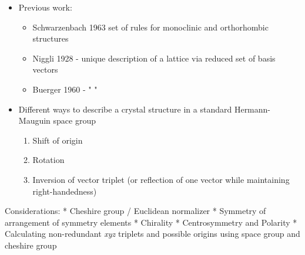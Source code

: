 \documentclass[11pt]{article}
\providecommand{\tightlist}{%
      \setlength{\itemsep}{0pt}\setlength{\parskip}{0pt}}
\begin{document}
\begin{itemize}
\tightlist
\item
  Previous work:

  \begin{itemize}
  \tightlist
  \item
    Schwarzenbach 1963 set of rules for monoclinic and orthorhombic
    structures
  \item
    Niggli 1928 - unique description of a lattice via reduced set of
    basis vectors
  \item
    Buerger 1960 - " "
  \end{itemize}
\item
  Different ways to describe a crystal structure in a standard
  Hermann-Mauguin space group

  \begin{enumerate}
  \def\labelenumi{\arabic{enumi}.}
  \tightlist
  \item
    Shift of origin
  \item
    Rotation
  \item
    Inversion of vector triplet (or reflection of one vector while
    maintaining right-handedness)
  \end{enumerate}
\end{itemize}

Considerations: * Cheshire group / Euclidean normalizer * Symmetry of
arrangement of symmetry elements * Chirality * Centrosymmetry and
Polarity * Calculating non-redundant \emph{xyz} triplets and possible
origins using space group and cheshire group
\end{document}
